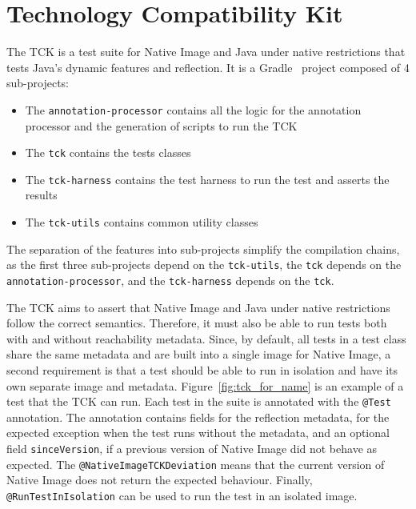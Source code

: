 \section{Technology Compatibility Kit}\label{TCK}
The TCK is a test suite for Native Image and Java under native restrictions that tests Java's dynamic features and reflection. 
It is a Gradle~\cite{noauthor_gradle_2024} project composed of 4 sub-projects: 
\begin{itemize}
    \item The \verb|annotation-processor| contains all the logic for the annotation processor and the generation of scripts to run the TCK
    \item The \verb|tck| contains the tests classes
    \item The \verb|tck-harness| contains the test harness to run the test and asserts the results
    \item The \verb|tck-utils| contains common utility classes
\end{itemize}
The separation of the features into sub-projects simplify the compilation chains, as the first three sub-projects depend on the \verb|tck-utils|, the \verb|tck| depends on the \verb|annotation-processor|, and the \verb|tck-harness| depends on the \verb|tck|.

The TCK aims to assert that Native Image and Java under native restrictions follow the correct semantics. Therefore, it must also be able to run tests both with and without reachability metadata. Since, by default, all tests in a test class share the same metadata and are built into a single image for Native Image, a second requirement is that a test should be able to run in isolation and have its own separate image and metadata. 
Figure~\ref{fig:tck_for_name} is an example of a test that the TCK can run. Each test in the suite is annotated with the \verb|@Test| annotation. The annotation contains fields for the reflection metadata, for the expected exception when the test runs without the metadata, and an optional field \verb|sinceVersion|, if a previous version of Native Image did not behave as expected. The \verb|@NativeImageTCKDeviation| means that the current version of Native Image does not return the expected behaviour. Finally, \verb|@RunTestInIsolation| can be used to run the test in an isolated image. 

